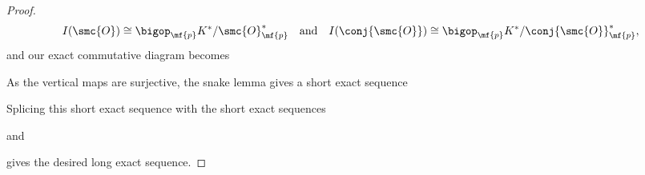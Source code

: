 \documentclass[12pt]{article}
\begin{document}
\begin{proof}
        \[
          I(\smc{O}) \cong \bigop_{\mf{p}}K^{\ast}/\smc{O}_{\mf{p}}^{\ast} \quad \text{and} \quad I(\conj{\smc{O}}) \cong \bigop_{\mf{p}}K^{\ast}/\conj{\smc{O}}_{\mf{p}}^{\ast},
        \]
        and our exact commutative diagram becomes
        \begin{center}
        \end{center}
        As the vertical maps are surjective, the snake lemma gives a short exact sequence
        \begin{center}
        \end{center}
        Splicing this short exact sequence with the short exact sequences
        \begin{center}
        \end{center}
        and
        \begin{center}
        \end{center}
        gives the desired long exact sequence.
      \end{proof}
\end{document}
